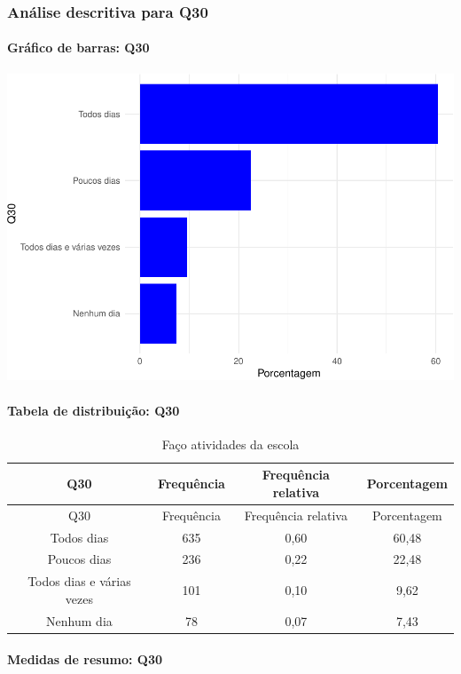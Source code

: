 \documentclass[]{article}
\let\oldparagraph\paragraph
\renewcommand{\paragraph}[1]{\oldparagraph{#1}\mbox{}}
\begin{document}
\hypertarget{anuxe1lise-descritiva-para-q30}{%
\subsubsection{Análise descritiva para Q30}\label{anuxe1lise-descritiva-para-q30}}

\hypertarget{gruxe1fico-de-barras-q30}{%
\paragraph{Gráfico de barras: Q30}\label{gruxe1fico-de-barras-q30}}

\begin{center}\includegraphics[width=0.75\linewidth]{relatorio_covid19_files/figure-latex/unnamed-chunk-954-1} \end{center}

\hypertarget{tabela-de-distribuiuxe7uxe3o-q30}{%
\paragraph{Tabela de distribuição: Q30}\label{tabela-de-distribuiuxe7uxe3o-q30}}

\begin{longtable}[]{@{}cccc@{}}
\caption{\label{tab:unnamed-chunk-955}Faço atividades da escola}\tabularnewline
\toprule
Q30 & Frequência & Frequência relativa & Porcentagem\tabularnewline
\midrule
\endfirsthead
\toprule
Q30 & Frequência & Frequência relativa & Porcentagem\tabularnewline
\midrule
\endhead
Todos dias & 635 & 0,60 & 60,48\tabularnewline
Poucos dias & 236 & 0,22 & 22,48\tabularnewline
Todos dias e várias vezes & 101 & 0,10 & 9,62\tabularnewline
Nenhum dia & 78 & 0,07 & 7,43\tabularnewline
\bottomrule
\end{longtable}

\hypertarget{medidas-de-resumo-q30}{%
\paragraph{Medidas de resumo: Q30}\label{medidas-de-resumo-q30}}
\end{document}
